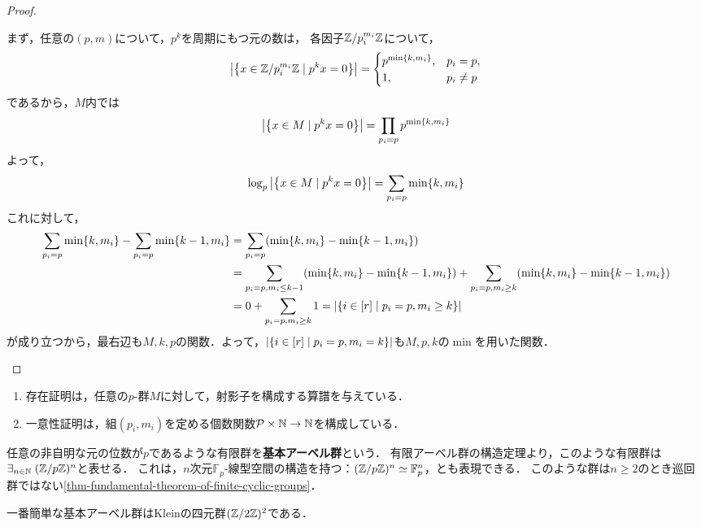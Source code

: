 \documentclass[uplatex,dvipdfmx]{jsreport}
\begin{document}
\begin{proof}
\begin{description}
        まず，任意の$(p,m)$について，$p^k$を周期にもつ元の数は，
        各因子$\mathbb{Z}/p_i^{m_i}\mathbb{Z}$について，
        \[\left|\left\{x\in\mathbb{Z}/p_i^{m_i}\mathbb{Z}\mid p^kx=0\right\}\right|=\begin{cases}
            p^{\min\{k,m_i\}},&p_i=p,\\
            1,&p_i\ne p
        \end{cases}\]
        であるから，$M$内では
        \[\left|\left\{x\in M\mid p^kx=0\right\}\right|=\prod_{p_i=p}p^{\min\{k,m_i\}}\]
        よって，
        \[\log_p\left|\left\{x\in M\mid p^kx=0\right\}\right|=\sum_{p_i=p}\min\{k,m_i\}\]
        これに対して，
        \begin{align*}
            \sum_{p_i=p}\min\{k,m_i\}-\sum_{p_i=p}\min\{k-1,m_i\}&=\sum_{p_i=p}(\min\{k,m_i\}-\min\{k-1,m_i\})\\
            &=\sum_{p_i=p,m_i\le k-1}(\min\{k,m_i\}-\min\{k-1,m_i\})+\sum_{p_i=p,m_i\ge k}(\min\{k,m_i\}-\min\{k-1,m_i\})\\
            &=0+\sum_{p_i=p,m_i\ge k}1=\left|\left\{i\in[r]\mid p_i=p,m_i\ge k\right\}\right|
        \end{align*}
        が成り立つから，最右辺も$M,k,p$の関数．よって，$\left|\left\{i\in[r]\mid p_i=p,m_i= k\right\}\right|$も$M,p,k$の$\min$を用いた関数．
    \end{description}
\end{proof}
\begin{remarks}\mbox{}
    \begin{enumerate}
        \item 存在証明は，任意の$p$-群$M$に対して，射影子を構成する算譜を与えている．
        \item 一意性証明は，組$(p_i,m_i)$を定める個数関数$\mathcal{P}\times\mathbb{N}\to\mathbb{N}$を構成している．
    \end{enumerate}
\end{remarks}

\begin{example}\label{exp-elementary-Abelian-group}
    任意の非自明な元の位数が$p$であるような有限群を\textbf{基本アーベル群}という．
    有限アーベル群の構造定理より，このような有限群は$\exists_{n\in\mathbb{N}}\;(\mathbb{Z}/p\mathbb{Z})^n$と表せる．
    これは，$n$次元$\mathbb{F}_p$-線型空間の構造を持つ：$(\mathbb{Z}/p\mathbb{Z})^n\simeq\mathbb{F}_p^n$，とも表現できる．
    このような群は$n\ge 2$のとき巡回群ではない\ref{thm-fundamental-theorem-of-finite-cyclic-groups}．

    一番簡単な基本アーベル群はKleinの四元群$(\mathbb{Z}/2\mathbb{Z})^2$である．
\end{example}
\end{document}
